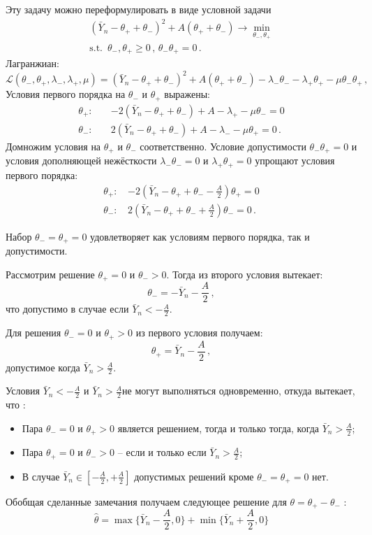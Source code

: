 \documentclass[a4paper]{article}
\begin{document}
Эту задачу можно переформулировать в виде условной задачи 
\begin{align*}
	(\bar{Y}_n - \theta_+ + \theta_-)^2 + A (\theta_+ + \theta_- ) \to \min_{\theta_-,\theta_+}\\
	\text{s.t. }\, \theta_-,\theta_+ \geq 0\,,\, \theta_- \theta_+ = 0\,.
\end{align*}
Лагранжиан:
\[
\mathcal{L} (\theta_-, \theta_+,\lambda_-,\lambda_+,\mu) =
	(\bar{Y}_n - \theta_+ + \theta_-)^2 + A (\theta_+ + \theta_- )
	- \lambda_- \theta_- - \lambda_+ \theta_+ - \mu \theta_- \theta_+ \,,
\]
Условия первого порядка на $\theta_-$ и $\theta_+$ выражены:
\begin{align*}
	\theta_+:\quad & - 2(\bar{Y}_n - \theta_+ + \theta_- ) + A - \lambda_+ - \mu \theta_- = 0\\
	\theta_-:\quad&   2(\bar{Y}_n - \theta_+ + \theta_- ) + A - \lambda_- - \mu \theta_+ = 0\,.
\end{align*}
Домножим условия на $\theta_+$ и $\theta_-$ соответственно. Условие допустимости
$\theta_- \theta_+ = 0$ и условия дополняющей нежёсткости $\lambda_-\theta_- =0$
и $\lambda_+\theta_+ = 0$ упрощают условия первого порядка:
\begin{align*}
	\theta_+:\, & - 2(\bar{Y}_n - \theta_+ + \theta_- - \frac{A}{2} ) \theta_+ = 0\\
	\theta_-:\, &   2(\bar{Y}_n - \theta_+ + \theta_- + \frac{A}{2} ) \theta_- = 0\,.
\end{align*}

Набор $\theta_- = \theta_+ = 0$ удовлетворяет как условиям первого порядка,
так и допустимости.

Рассмотрим решение $\theta_+ = 0$ и $\theta_- > 0$. Тогда из второго условия
вытекает:
\[ \theta_- = - \bar{Y}_n - \frac{A}{2}\,, \]
что допустимо в случае если $\bar{Y}_n < -\tfrac{A}{2}$.

Для решения $\theta_- = 0$ и $\theta_+ > 0$ из первого условия получаем:
\[ \theta_+ = \bar{Y}_n - \frac{A}{2} \,, \]
допустимое когда $\bar{Y}_n > \tfrac{A}{2}$.

Условия $\bar{Y}_n < -\tfrac{A}{2}$ и $\bar{Y}_n > \tfrac{A}{2}$не могут выполняться
одновременно, откуда вытекает, что :
\begin{itemize}
	\item Пара $\theta_- = 0$ и $\theta_+ > 0$ является решением, тогда и только тогда,
	когда $\bar{Y}_n > \tfrac{A}{2}$;
	\item Пара $\theta_+ = 0$ и $\theta_- > 0$ -- если и только если $\bar{Y}_n > \tfrac{A}{2}$;
	\item В случае $\bar{Y}_n\in [-\tfrac{A}{2}, +\tfrac{A}{2}]$ допустимых решений кроме
	$\theta_- = \theta_+ = 0$ нет.
\end{itemize}
Обобщая сделанные замечания получаем следующее решение для $\theta = \theta_+-\theta_-$ :
\[
\hat{\theta}
= \max\bigl\{ \bar{Y}_n - \frac{A}{2}, 0 \bigr\}
+ \min\bigl\{ \bar{Y}_n + \frac{A}{2}, 0 \bigr\}
\]
\end{document}

